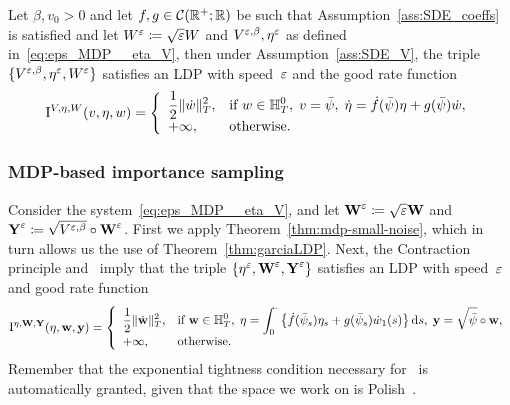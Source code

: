 \begin{theorem}\label{thm:mdp-small-noise}
Let $\beta, v_0>0$ and let $f, g \in \mathcal{C}(\mathbb{R}^+;  \mathbb{R})$ be such that Assumption~\ref{ass:SDE_coeffs} is satisfied and let $W^{\varepsilon} \coloneqq \sqrt{\varepsilon}W$ and $V^{\varepsilon,\beta}, \eta^{\varepsilon}$ as defined in~\eqref{eq:eps_MDP__eta_V}, then under Assumption~\ref{ass:SDE_V}, the triple
$\{V^{\varepsilon,\beta}, \eta^\varepsilon,W^\varepsilon\}$ satisfies an LDP with speed~$\varepsilon$ and the good rate function
\begin{equation*}
\mathrm{I}^{V,\eta,W}(v,\eta,w) = 
\left\{
\begin{array}{ll}
\displaystyle \frac{1}{2}\|\dot{w}\|_{T}^2, & \text{if }
\displaystyle 
w \in \mathbb{H}_T^0,\;
v = \bar\psi,\;
\dot{\eta} = \dot{f}(\bar\psi)\eta + g(\bar\psi)\dot{w},\\
+\infty, & \text{otherwise}.
\end{array}
\right.
\end{equation*}
\end{theorem}


\subsubsection{MDP-based importance sampling}
Consider the system~\eqref{eq:eps_MDP__eta_V}, 
and let $\boldsymbol{\mathrm{W}}^\varepsilon \coloneqq \sqrt{\varepsilon}\boldsymbol{\mathrm{W}}$ and $\boldsymbol{\mathrm{Y}}^\varepsilon \coloneqq \sqrt{V^{\varepsilon,\beta}}\circ \boldsymbol{\mathrm{W}}^\varepsilon$. 
First we apply Theorem~\ref{thm:mdp-small-noise}, which in turn allows us the use of Theorem~\ref{thm:garciaLDP}. Next, the Contraction principle and~\cite[Exercise 4.2.7]{Dembo2010LargeApplications} imply that the triple $\{\eta^\varepsilon,\boldsymbol{\mathrm{W}}^\varepsilon, \boldsymbol{\mathrm{Y}}^\varepsilon\}$ satisfies an LDP with speed~$\varepsilon$ and good rate function
\begin{equation*}
\mathrm{I}^{\eta,\boldsymbol{\mathrm{W}},\boldsymbol{\mathrm{Y}}}(\eta,\boldsymbol{\mathrm{w}}, \boldsymbol{\mathrm{y}}) =
\left\{
\begin{array}{ll}
\displaystyle 
\frac{1}{2}\|\dot{\boldsymbol{\mathrm{w}}}\|_{T}^2, & \text{if }
\displaystyle 
\boldsymbol{\mathrm{w}} \in \mathbb{H}_T^0,\;
\eta = \int_0^\cdot\left\{\dot{f}(\bar\psi_s)\eta_s + g(\bar\psi_s)\dot{w}_1(s)\right\}\mathrm{d} s,\;
\boldsymbol{\mathrm{y}} = \sqrt{\bar\psi}\circ \boldsymbol{\mathrm{w}},\\
+\infty, & \text{otherwise}.
\end{array}
\right.
\end{equation*}
Remember that the exponential tightness condition necessary for~\cite[Exercise 4.2.7]{Dembo2010LargeApplications} is automatically granted, given that the space we work on is Polish~\cite[Lemma~2.6]{Lynch1987LargeIncrements}.

